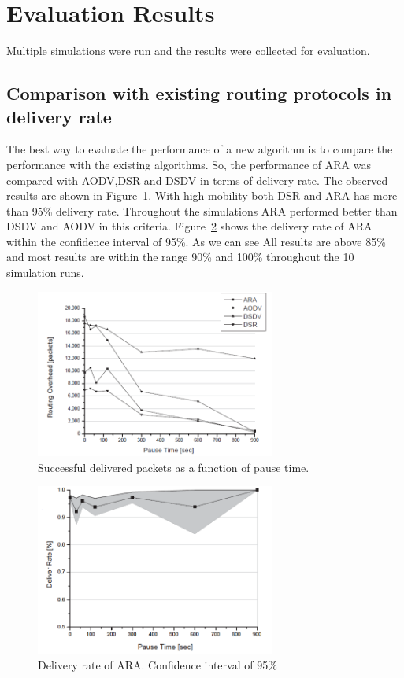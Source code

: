 \section{Evaluation Results}
Multiple simulations were run and the results were collected for evaluation. 
\subsection{Comparison with existing routing protocols in delivery rate}
The best way to evaluate the performance of a new algorithm is to compare the performance with the existing algorithms. So, the performance of ARA was compared with AODV,DSR and DSDV in terms of delivery rate. The observed results are shown in Figure~\ref{fig:picture1}. With high mobility both DSR and ARA has more than 95\% delivery rate. 
Throughout the simulations ARA performed better than DSDV and AODV in this criteria. Figure~\ref{fig:picture2} shows the delivery rate of ARA within the confidence interval of 95\%. As we can see All results are above 85\% and most results are within the range 90\% and 100\% throughout the 10 simulation runs.


\begin{figure}[t!]
\centering
\includegraphics[width=0.7\textwidth]{Picture1.png}
\caption{\label{fig:picture1}Successful delivered packets as a
function of pause time.}
\end{figure}


\begin{figure}[t!]
\centering
\includegraphics[width=0.7\textwidth]{Picture2.png}
\caption{\label{fig:picture2}Delivery rate of ARA. Confidence interval of 95\%}
\end{figure}


